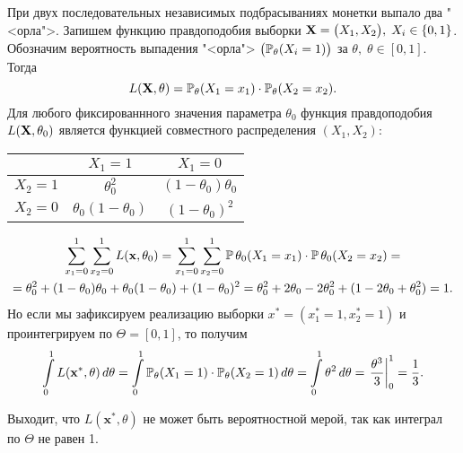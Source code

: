 \begin{exmp}
    При двух последовательных независимых подбрасываниях монетки выпало два "<орла">.
    Запишем функцию правдоподобия выборки $\mathbf{X}= \bigl(X_1, X_2\bigr), \; X_i \in \{0, 1\}$.
    Обозначим вероятность выпадения "<орла"> ${\bigl(\operatorname{\operatorname{\mathbb{P}}_{\theta}}(X_i = 1)\bigr)}$ за $\theta, \; \theta \in [0, 1]$.
    Тогда
    \begin{equation*}
        L(\mathbf{X}, \theta) = \operatorname{\operatorname{\mathbb{P}}_{\theta}} (X_1 = x_1) \cdot \operatorname{\operatorname{\mathbb{P}}_{\theta}} (X_2 = x_2).
    \end{equation*}
    Для любого фиксированнного значения параметра $\theta_0$ функция правдоподобия $L(\mathbf{X}, \theta_0)$ является функцией совместного распределения $(X_1, X_2)$:
    \begin{center}
        \begin{tabular}{|c|c|c|}
            \hline
            & $X_1 = 1$ & $X_1 = 0$ \\
            \hline
            $X_2 = 1$ & $\theta^2_0$ & $(1-\theta_0)\theta_0$ \\
            \hline
            $X_2 = 0$ & $\theta_0(1-\theta_0)$ & $(1-\theta_0)^2$ \\
            \hline
        \end{tabular}
    \end{center}
    \begin{gather*}
        \sum\limits_{x_1 = 0}^{1} \sum\limits_{x_2 = 0}^{1} L(\mathbf{x}, \theta_0) = 
        \sum\limits_{x_1 = 0}^{1} \sum\limits_{x_2 = 0}^{1} \operatorname{\mathbb{P}}{\theta_0} (X_1 = x_1) \cdot \operatorname{\mathbb{P}}{\theta_0} (X_2 = x_2) = \\
        = \theta_0^2 + (1 - \theta_0)\theta_0 + \theta_0(1-\theta_0) + (1 - \theta_0)^2 
        = \theta_0^2 + 2\theta_0 - 2\theta_0^2 + (1 - 2\theta_0 + \theta_0^2)
        = 1.
    \end{gather*}
    Но если мы зафиксируем реализацию выборки $x^* = (x_{1}^{*} = 1, x_{2}^{*} = 1)$ и проинтегрируем по $\Theta = [0, 1]$, то получим
    \begin{equation*}
        \int\limits_0^1 L(\mathbf{x}^*, \theta) \, d\theta = 
        \int\limits_0^1 \operatorname{\operatorname{\mathbb{P}}_{\theta}}(X_1 = 1) \cdot \operatorname{\operatorname{\mathbb{P}}_{\theta}}(X_2 = 1) \, d\theta = 
        \int\limits_0^1 \theta^2 \, d\theta = 
        \left. \frac{\theta^3}{3} \right|_0^1 = 
        \frac{1}{3}.
    \end{equation*}

    Выходит, что $L(\mathbf{x}^*, \theta)$ не может быть вероятностной мерой, так как интеграл по $\Theta$ не равен 1.
\end{exmp}

